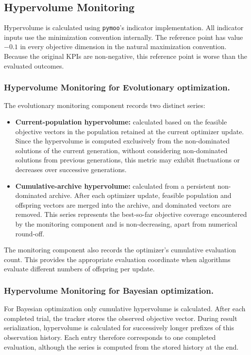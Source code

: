 \subsection{Hypervolume Monitoring}
\label{sec:two_finger_monitoring}

Hypervolume is calculated using \texttt{pymoo}'s indicator implementation.
All indicator inputs use the minimization convention internally.
The reference point has value $-0.1$ in every objective dimension in the natural maximization convention.
Because the original KPIs are non-negative, this reference point is worse
than the evaluated outcomes.

\subsubsection{Hypervolume Monitoring for Evolutionary optimization.}
The evolutionary monitoring component records two distinct series:
\begin{itemize}
    \item \textbf{Current-population hypervolume:} calculated based on the feasible objective vectors in the population retained at the current
    optimizer update. Since the hypervolume is computed exclusively from the non-dominated solutions of the current generation, without considering
    non-dominated solutions from previous generations, this metric may exhibit fluctuations or decreases over successive generations.
    \item \textbf{Cumulative-archive hypervolume:} calculated from a persistent
          non-dominated archive. After each optimizer update, feasible
          population and offspring vectors are merged into the archive,
          and dominated vectors are removed. This series represents the
          best-so-far objective coverage encountered by the monitoring
          component and is non-decreasing, apart from numerical round-off.
\end{itemize}

The monitoring component also records the optimizer's cumulative evaluation
count. This provides the appropriate evaluation coordinate when algorithms
evaluate different numbers of offspring per update.

\subsubsection{Hypervolume Monitoring for Bayesian optimization.}
For Bayesian optimization only cumulative hypervolume is calculated. After each completed trial,
the tracker stores the observed objective vector. During result serialization,
hypervolume is calculated for successively longer prefixes of this observation
history. Each entry therefore corresponds to one completed evaluation,
although the series is computed from the stored history at the end.

